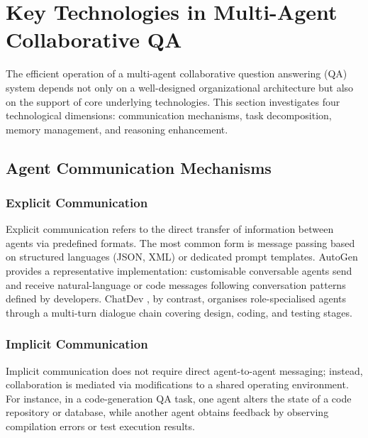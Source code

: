 \section{Key Technologies in Multi-Agent Collaborative QA}
\label{sec:key_tech}

The efficient operation of a multi-agent collaborative question answering (QA) system depends not only on a well-designed organizational architecture but also on the support of core underlying technologies.
This section investigates four technological dimensions: communication mechanisms, task decomposition, memory management, and reasoning enhancement.

\subsection{Agent Communication Mechanisms}
\label{sec:comm}

\subsubsection{Explicit Communication}
\label{sec:explicit_comm}

Explicit communication refers to the direct transfer of information between agents via predefined formats.
The most common form is message passing based on structured languages (JSON,
XML) or dedicated prompt templates.
AutoGen \citep{wu2024autogen} provides a representative implementation:
customisable conversable agents send and receive natural-language or code
messages following conversation patterns defined by developers.
ChatDev \citep{qian2023chatdev}, by contrast, organises role-specialised agents
through a multi-turn dialogue chain covering design, coding, and testing stages.


\subsubsection{Implicit Communication}
\label{sec:implicit_comm}

Implicit communication does not require direct agent-to-agent messaging; instead, collaboration is mediated via modifications to a shared operating environment.
For instance, in a code-generation QA task, one agent alters the state of a code repository or database, while another agent obtains feedback by observing compilation errors or test execution results.

